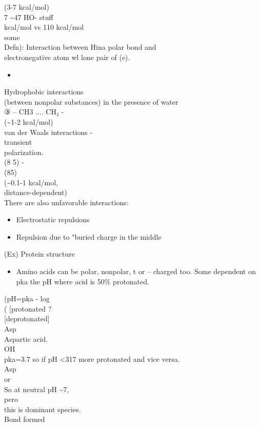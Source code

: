 \documentclass{article}
\begin{document}
(3-7 kcal/mol)\\
7 \textasciitilde47 HO- stuff\\
kcal/mol vs 110 kcal/mol\\
some\\
Defn): Interaction between Hina polar bond and\\
electronegative atom wl lone pair of (e).\\
\begin{itemize}
\item 
\end{itemize}
Hydrophobic interactions\\
(between nonpolar substances) in the presence of water\\
③ – CH3 .... CH₂ -\\
(\textasciitilde1-2 kcal/mol)\\
van der Waals interactions -\\
transient\\
polarization.\\
(8 5) -\\
(85)\\
(\textasciitilde0.1-1 kcal/mol,\\
distance-dependent)\\
There are also unfavorable interactions:
\begin{itemize}
\item  Electrostatic repulsions
\item  Repulsion due to "buried charge in the middle
\end{itemize}
(Ex) Protein structure
\begin{itemize}
\item  Amino acids can be polar, nonpolar, t or – charged too.
Some dependent on pka the pH where acid is 50\% protonated.
\end{itemize}
(pH=pka - log\\
( {[}protonated ?\\
{[}deprotonated{]}\\
Asp\\
Aspartic acid.\\
OH\\
pka=3.7 so if pH <317 more protonated and vice versa.\\
Asp\\
or\\
So at neutral pH \textasciitilde7,\\
pero\\
this is dominant species.\\
Bond formed\\
\end{document}
